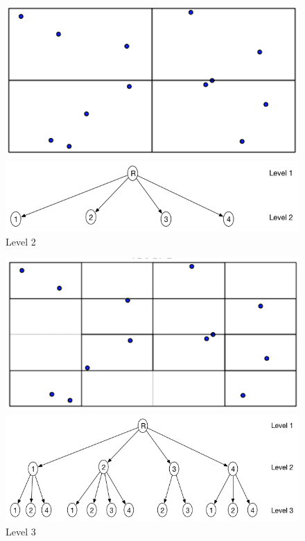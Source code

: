 \documentclass{article}
\begin{document}
\begin{figure}[ht]
\caption{Level 2}
  \centering
  \begin{minipage}[b]{0.35\textwidth}
    \includegraphics[width=\textwidth]{Quadtree_basic_scenario2}
  \end{minipage}
  \hfill
  \begin{minipage}[b]{0.6\textwidth}
    \includegraphics[width=\textwidth]{1_1Quad_2_tree}
  \end{minipage}
\end{figure}

\begin{figure}[ht]
\caption{Level 3}
  \centering
  \begin{minipage}[b]{0.35\textwidth}
    \includegraphics[width=\textwidth]{Quadtree_basic_scenario3}
  \end{minipage}
  \hfill
  \begin{minipage}[b]{0.6\textwidth}
    \includegraphics[width=\textwidth]{1_1Quad_3_tree}
  \end{minipage}
\end{figure}
\end{document}
